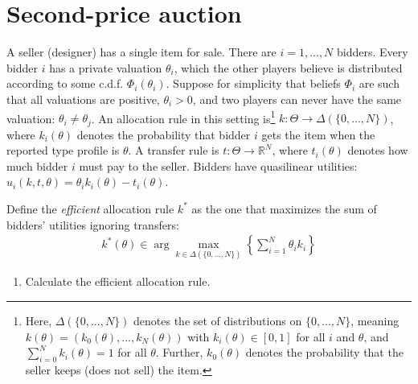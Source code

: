 \documentclass[a4paper]{article}
\begin{document}
%
%
%	
%



\section{Second-price auction}

A seller (designer) has a single item for sale. There are $i={1,...,N}$ bidders. Every bidder $i$ has a private valuation $\theta_i$, which the other players believe is distributed according to some c.d.f. $\Phi_i(\theta_i)$. 
Suppose for simplicity that beliefs $\Phi_i$ are such that all valuations are positive, $\theta_i > 0$, and two players can never have the same valuation: $\theta_i \neq \theta_j$.
An allocation rule in this setting is\footnote{Here, $\varDelta(\{0,...,N\})$ denotes the set of distributions on $\{0,...,N\}$, meaning $k(\theta) = \left( k_0(\theta), ..., k_N(\theta) \right)$ with $k_i(\theta) \in [0,1]$ for all $i$ and $\theta$, and $\sum_{i=0}^N k_i(\theta) = 1$ for all $\theta$. Further, $k_0(\theta)$ denotes the probability that the seller keeps (does not sell) the item.} 
$k: \Theta \to \varDelta(\{0,...,N\})$, where $k_i(\theta)$ denotes the probability that bidder $i$ gets the item when the reported type profile is $\theta$. A transfer rule is $t: \Theta \to \mathbb{R}^N$, where $t_i(\theta)$ denotes how much bidder $i$ must pay to the seller.
Bidders have quasilinear utilities: $u_i(k,t,\theta) = \theta_i k_i(\theta) - t_i(\theta)$.

Define the \emph{efficient} allocation rule $k^*$ as the one that maximizes the sum of bidders' utilities ignoring transfers:
\begin{align*}
	k^*(\theta) \in \arg \max_{k \in \varDelta(\{0,...,N\})} \left\{ \sum_{i=1}^N \theta_i k_i \right\}
\end{align*}
\begin{enumerate}
	\item Calculate the efficient allocation rule.
\end{enumerate}
\end{document}
